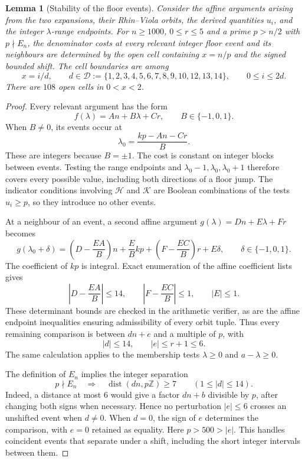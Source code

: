 \documentclass[11pt]{amsart}
\newcommand{\Z}{\mathbb Z}
\newcommand{\dist}{\operatorname{dist}}
\theoremstyle{plain}
\newtheorem{lemma}[theorem]{Lemma}
\theoremstyle{remark}\newtheorem{remark}[theorem]{Remark}
\numberwithin{equation}{section}
\begin{document}
\begin{lemma}[Stability of the floor events]\label{f:lem:floor-stability}
Consider the affine arguments arising from the two expansions, their
Rhin--Viola orbits, the derived quantities $u_i$, and the integer
$\lambda$-range endpoints. For $n\ge1000$, $0\le r\le5$ and a prime
$p>n/2$ with $p\nmid E_n$, the denominator costs at every relevant
integer floor event and its neighbours are determined by the open
cell containing $x=n/p$ and the signed bounded shift. The cell boundaries
are among
\begin{equation}\label{f:eq:floor-cuts}
 x=i/d,\qquad
 d\in\mathcal D:=\{1,2,3,4,5,6,7,8,9,10,12,13,14\},
 \qquad 0\le i\le2d.
\end{equation}
There are $108$ open cells in $0<x<2$.
\end{lemma}
\begin{proof}
Every relevant argument has the form
\[
 f(\lambda)=An+B\lambda+Cr,\qquad B\in\{-1,0,1\}.
\]
When $B\ne0$, its events occur at
\[
 \lambda_0=\frac{kp-An-Cr}{B}.
\]
These are integers because $B=\pm1$. The cost is constant on integer
blocks between events. Testing the range endpoints and
$\lambda_0-1,\lambda_0,\lambda_0+1$ therefore covers every possible
value, including both directions of a floor jump. The indicator
conditions involving $\mathcal H$ and $\mathcal K$ are Boolean
combinations of the tests $u_i\ge p$, so they introduce no other events.

At a neighbour of an event, a second affine argument
$g(\lambda)=Dn+E\lambda+Fr$ becomes
\begin{equation}\label{f:eq:event-substitution}
 g(\lambda_0+\delta)=
 \left(D-\frac{EA}{B}\right)n+\frac EB kp
 +\left(F-\frac{EC}{B}\right)r+E\delta,
 \qquad \delta\in\{-1,0,1\}.
\end{equation}
The coefficient of $kp$ is integral. Exact enumeration of the affine
coefficient lists gives
\[
 \left|D-\frac{EA}{B}\right|\le14,
 \qquad \left|F-\frac{EC}{B}\right|\le1,
 \qquad |E|\le1.
\]
These determinant bounds are checked in the arithmetic verifier, as are
the affine endpoint inequalities ensuring admissibility of every orbit
tuple. Thus every remaining comparison is between $dn+e$ and a
multiple of $p$, with
\[
 |d|\le14,\qquad |e|\le r+1\le6.
\]
The same calculation applies to the membership tests
$\lambda\ge0$ and $a-\lambda\ge0$.

The definition of $E_n$ implies the integer separation
\begin{equation}\label{f:eq:prime-separation}
 p\nmid E_n\quad\Longrightarrow\quad
 \dist(dn,p\Z)\ge7\qquad(1\le |d|\le14).
\end{equation}
Indeed, a distance at most $6$ would give a factor $dn+b$ divisible by
$p$, after changing both signs when necessary. Hence no perturbation
$|e|\le6$ crosses an unshifted event when $d\ne0$.
When $d=0$, the sign of $e$ determines the comparison, with $e=0$
retained as equality. Here $p>500>|e|$. This handles coincident events
that separate under a shift, including the short integer intervals
between them.


\end{proof}
\end{document}
